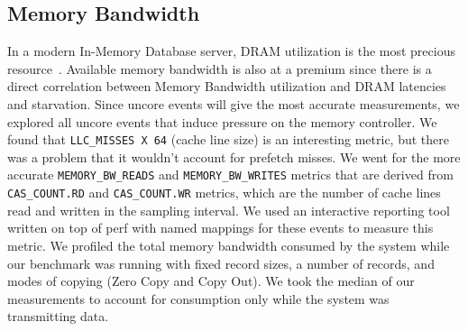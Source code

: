 


\subsection{Memory Bandwidth}
In a modern In-Memory Database server, DRAM utilization is the most precious resource~\cite{ramcloudfast}. 
 Available memory bandwidth is also at a premium since there is a direct correlation between Memory Bandwidth
 utilization and DRAM latencies and starvation. Since uncore events will give the most accurate measurements,
 we explored all uncore events that induce pressure on the memory controller. We found that 
\texttt{LLC\_MISSES X 64} (cache line size) is an interesting metric, but there was a problem that it wouldn't account for prefetch 
 misses. We went for the more accurate \texttt{MEMORY\_BW\_READS} and \texttt{MEMORY\_BW\_WRITES} metrics that are derived from 
 \texttt{CAS\_COUNT.RD} and \texttt{CAS\_COUNT.WR} metrics, which are the number of cache lines read and written in the sampling 
 interval. We used an interactive reporting tool written on top of perf with named mappings for these events
 to measure this metric. We profiled the total memory bandwidth consumed by the system while our benchmark 
 was running with fixed record sizes, a number of records, and modes of copying (Zero Copy and Copy Out). We took the median of our measurements 
 to account for consumption only while the system was transmitting data.


